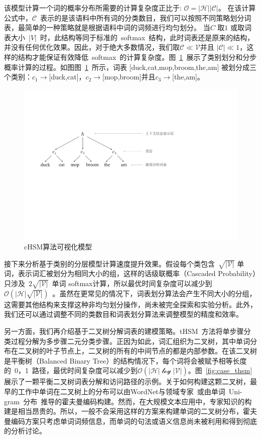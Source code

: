 该模型计算一个词的概率分布所需要的计算复杂度正比于: $\mathcal{O =|H||C|}$。 在该计算公式中，$\mathcal{C}$~表示的是该语料中所有词的分类数目，我们可以按照不同策略划分词表，最简单的一种策略就是根据语料中词的词频进行均匀划分。 当$C$ 取$1$ 或取词表大小~$|V|$~时，此结构等同于标准的~softmax~结构，此时词表还是原来的结构，并没有任何优化效果。因此，对于绝大多数情况，我们取$\mathcal{C} \ll \mathcal{V}$并且 $|\mathcal{C}|\ll 1$，这样的结构才能保证有效降低~softmax~的计算复杂度。图~\ref{fig:case_hsm}~展示了类别划分和分步概率计算的过程。如图图~\ref{fig:case_hsm}~所示，词表 [duck,cat,mop,broom,the,am] 被划分成三个类别：$c_1\to$[duck,cat]，$c_2\to$[mop,broom]并且$c_3\to$[the,am]。
\begin{figure}[!t]
  \centering
\includegraphics[width=.9\linewidth]{./figures/case_chsm.pdf}
\caption{cHSM算法可视化模型}\label{fig:case_hsm}
\end{figure}

接下来分析基于类别的分层模型计算速度提升效果。假设每个类包含~$\sqrt{\mathcal{|V|}}$ 单词，表示词汇被划分为相同大小的组，这样的话级联概率（Cascaded Probability）只涉及~$2\sqrt{\mathcal{|V|}}$~单词 softmax计算，所以最优时间复杂度可以减少到~$\mathcal{O}(\mathcal{|H|}\sqrt{\mathcal{|V|}})$~。虽然在更常见的情况下，词表划分算法会产生不同大小的分组，这需要其他结构来支撑这种非均匀划分操作，尚未被完全探索和实验分析。此外，我们还可以通过调整不同的类数目和词表划分算法来调整模型的精度和效率。

另一方面，我们再介绍基于二叉树分解词表的建模策略。tHSM~方法将单步骤分类过程分解为多步骤二元分类步骤。正因为如此，词汇组织为二叉树，其中单词分布在二叉树的叶子节点上，二叉树的所有的中间节点的都是内部参数。在该二叉树是平衡树（Balanced Binary Tree）的结构情况下，每个词将会被赋予相等长度的~0，1~路径，最优时间复杂度可以减少到$\mathcal{O(|H|\log \mathcal{|V|})}$。图~\ref{fig:case_thsm} 展示了一颗平衡二叉树词表分解和访问路径的示例。关于如何构建这颗二叉树，最早的工作中单词在二叉树上的分布可以由WordNet与领域专家~或由单词~Uni-gram~分布~推导的霍夫曼编码构建。然而，在大规模文本应用中，专家知识的构建是相当昂贵的。所以，一般不会采用这样的方案来构建单词的二叉树分布，霍夫曼编码方案只考虑单词词频信息，而单词的句法或语义信息尚未被利用和得到彻底的分析讨论。


